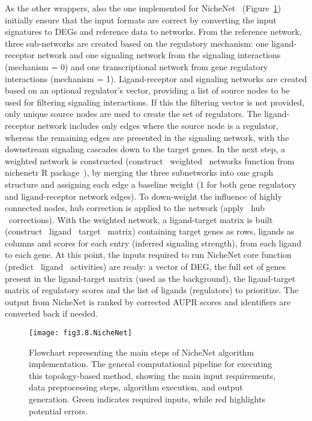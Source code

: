 As the other wrappers, also the one implemented for NicheNet~\cite{RN42} (Figure~\ref{fig:fig3.8.NicheNet}) initially ensure that the input formats are correct by converting the input signatures to DEGs and reference data to networks. From the reference network, three sub-networks are created based on the regulatory mechanism: one ligand-receptor network and one signaling network from the signaling interactions (mechanism = 0) and one transcriptional network from gene regulatory interactions (mechanism = 1). Ligand-receptor and signaling networks are created based on an optional regulator's vector, providing a list of source nodes to be used for filtering signaling interactions. 
If this the filtering vector is not provided, only unique source nodes are used to create the set of regulators. The ligand-receptor network includes only edges where the source node is a regulator, whereas the remaining edges are presented in the signaling network, with the downstream signaling cascades down to the target genes. In the next step, a weighted network is constructed (construct \ weighted \ networks function from nichenetr \gls{R} package~\cite{RN42}), by merging the three subnetworks into one graph structure and assigning each edge a baseline weight (1 for both gene regulatory and ligand-receptor network edges). 
To down-weight the influence of highly connected nodes, hub correction is applied to the network (apply \ hub \ corrections). With the weighted network, a ligand-target matrix is built (construct \ ligand \ target \ matrix) containing target genes as rows, ligands as columns and scores for each entry (inferred signaling strength), from each ligand to each gene. At this point, the inputs required to run NicheNet core function (predict \ ligand \ activities) are ready: a vector of DEG, the full set of genes present in the ligand-target matrix (used as the background), the ligand-target matrix of regulatory scores and the list of ligands (regulators) to prioritize. The output from NicheNet is ranked by corrected \gls{AUPR} scores and identifiers are converted back if needed.

\begin{figure}[htbp]
    \centering
    \texttt{[image: fig3.8.NicheNet]}
    \caption[Flowchart representing the main steps of NicheNet algorithm implementation.]{Flowchart representing the main steps of NicheNet algorithm implementation. The general computational pipeline for executing this topology-based method, showing the main input requirements, data preprocessing steps, algorithm execution, and output generation. Green indicates required inputs, while red highlights potential errors.}
    \label{fig:fig3.8.NicheNet}
\end{figure}

